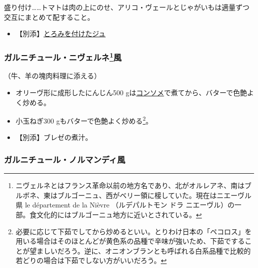 \begin{recette}
盛り付け\ldots{}\ldots{}トマトは肉の上にのせ、アリコ・ヴェールとじゃがいもは適量ずつ交互にまとめて配すること。

\begin{itemize}
\tightlist
\item
  【別添】\protect\hyperlink{jus-de-veau-lie}{とろみを付けたジュ}
\end{itemize}

\atoaki{}

\hypertarget{garniture-nivernaise}{%
\subsubsection[ガルニチュール・ニヴェルネ風]{\texorpdfstring{ガルニチュール・ニヴェルネ\footnote{ニヴェルネとはフランス革命以前の地方名であり、北がオルレアネ、南はブルボネ、東はブルゴーニュ、西がベリー領に椄していた。現在はニエーヴル県
  le département de la Nièvre （ルデパルトモン ドラ
  ニエーヴル）の一部。食文化的にはブルゴーニュ地方に近いとされている。}風}{ガルニチュール・ニヴェルネ風}}\label{garniture-nivernaise}}



（牛、羊の塊肉料理に添える）

\begin{itemize}
\item
  オリーヴ形に成形したにんじん500
  gは\protect\hyperlink{consomme-blanc-simple}{コンソメ}で煮てから、バターで色艶よく炒める。
\item
  小玉ねぎ300 gもバターで色艶よく炒める\footnote{必要に応じて下茹でしてから炒めるといい。とりわけ日本の「ペコロス」を用いる場合はそのほとんどが黄色系の品種で辛味が強いため、下茹ですることが望ましいだろう。逆に、オニオンブランとも呼ばれる白系品種で比較的若どりの場合は下茹でしない方がいいだろう。}。
\item
  【別添】ブレゼの煮汁。
\end{itemize}

\atoaki{}

\hypertarget{garniture-normande}{%
\subsubsection{ガルニチュール・ノルマンディ風}\label{garniture-normande}}


\end{recette}
